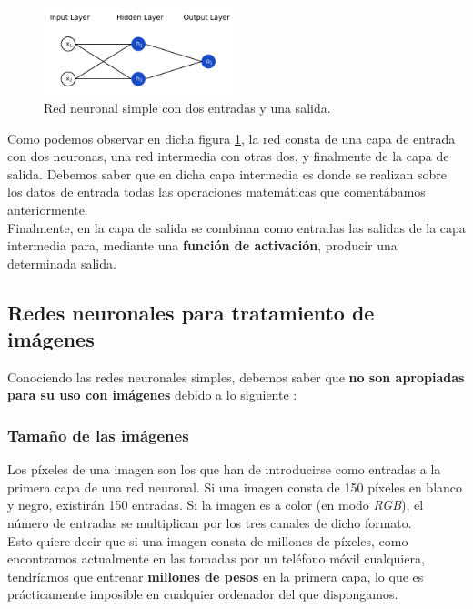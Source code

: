 \documentclass[]{scrartcl}
\begin{document}
		\begin{figure}[h]
			\centering
			\includegraphics[width=0.5\textwidth]{./img/neural-network}
			\caption{Red neuronal simple con dos entradas y una salida.}
			\label{neural-network}
		\end{figure}
	
		Como podemos observar en dicha figura \ref{neural-network}, la red consta de una capa de entrada con dos neuronas, una red intermedia con otras dos, y finalmente de la capa de salida. Debemos saber que en dicha capa intermedia es donde se realizan sobre los datos de entrada todas las operaciones matemáticas que comentábamos anteriormente.\\
		
		Finalmente, en la capa de salida se combinan como entradas las salidas de la capa intermedia para, mediante una \textbf{función de activación}, producir una determinada salida.
		
	\subsection{Redes neuronales para tratamiento de imágenes}
	
		Conociendo las redes neuronales simples, debemos saber que \textbf{no son apropiadas para su uso con imágenes} debido a lo siguiente \cite{intro-convolutional-nn}:
		
		\subsubsection*{Tamaño de las imágenes}
		
			Los píxeles de una imagen son los que han de introducirse como entradas a la primera capa de una red neuronal. Si una imagen consta de 150 píxeles en blanco y negro, existirán 150 entradas. Si la imagen es a color (en modo \textit{RGB}), el número de entradas se multiplican por los tres canales de dicho formato.\\
			 
			Esto quiere decir que si una imagen consta de millones de píxeles, como encontramos actualmente en las tomadas por un teléfono móvil cualquiera, tendríamos que entrenar \textbf{millones de pesos} en la primera capa, lo que es prácticamente imposible en cualquier ordenador del que dispongamos.
			 
\end{document}
